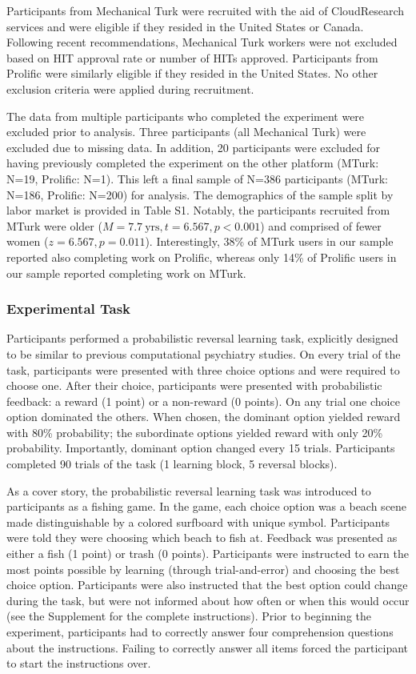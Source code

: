 \documentclass[a4paper,notitlepage,12pt]{article}
\begin{document}
Participants from Mechanical Turk were recruited with the aid of CloudResearch services and were eligible if they resided in the United States or Canada. Following recent recommendations, Mechanical Turk workers were not excluded based on HIT approval rate or number of HITs approved. Participants from Prolific were similarly eligible if they resided in the United States. No other exclusion criteria were applied during recruitment. 

The data from multiple participants who completed the experiment were excluded prior to analysis. Three participants (all Mechanical Turk) were excluded due to missing data. In addition, 20 participants were excluded for having previously completed the experiment on the other platform (MTurk: N=19, Prolific: N=1). This left a final sample of N=386 participants (MTurk: N=186, Prolific: N=200) for analysis. The demographics of the sample split by labor market is provided in Table S1. Notably, the participants recruited from MTurk were older ($M = 7.7 \ \text{yrs}, t = 6.567, p < 0.001$) and comprised of fewer women ($z = 6.567, p = 0.011$). Interestingly, 38\% of MTurk users in our sample reported also completing work on Prolific, whereas only 14\% of Prolific users in our sample reported completing work on MTurk. 

\subsubsection{Experimental Task}

Participants performed a probabilistic reversal learning task, explicitly designed to be similar to previous computational psychiatry studies. On every trial of the task, participants were presented with three choice options and were required to choose one. After their choice, participants were presented with probabilistic feedback: a reward (1 point) or a non-reward (0 points). On any trial one choice option dominated the others. When chosen, the dominant option yielded reward with 80\% probability; the subordinate options yielded reward with only 20\% probability. Importantly, dominant option changed every 15 trials. Participants completed 90 trials of the task (1 learning block, 5 reversal blocks). 

As a cover story, the probabilistic reversal learning task was introduced to participants as a fishing game. In the game, each choice option was a beach scene made distinguishable by a colored surfboard with unique symbol. Participants were told they were choosing which beach to fish at. Feedback was presented as either a fish (1 point) or trash (0 points). Participants were instructed to earn the most points possible by learning (through trial-and-error) and choosing the best choice option. Participants were also instructed that the best option could change during the task, but were not informed about how often or when this would occur (see the Supplement for the complete instructions). Prior to beginning the experiment, participants had to correctly answer four comprehension questions about the instructions. Failing to correctly answer all items forced the participant to start the instructions over.
\end{document}
